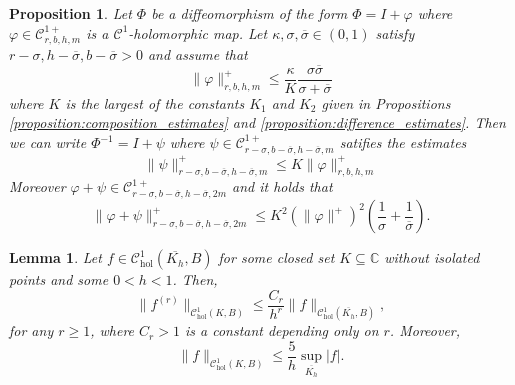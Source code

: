 \documentclass[10pt,a4paper]{amsart}
\newtheorem{proposition}{Proposition}
\newtheorem{lemma}{Lemma}
\newcommand{\C}{\mathbb{C}}
\begin{document}
\begin{proposition}
\label{proposition:inverse_estimates}
 Let $\Phi$ be a diffeomorphism of the form $\Phi=I+\varphi$ where $\varphi\in\mathscr C^{1+}_{r,b,h,m}$ is a $\mathscr C^1$-holomorphic map. Let $\kappa,\sigma,\overline\sigma\in(0,1)$ satisfy $r-\sigma,h-\overline\sigma,b-\overline\sigma>0$ and assume that 
 \begin{equation}
 \label{equation:assumption_inverse}
 \|\varphi\|_{r,b,h,m}^+
 \leq
 \frac{\kappa}
 {K}\frac{\sigma\overline\sigma}{\sigma+\overline\sigma}
 \end{equation}
 where $K$ is the largest of the constants $K_1$ and $K_2$ given in Propositions \ref{proposition:composition_estimates} and \ref{proposition:difference_estimates}. Then we can write $\Phi^{-1} = I+\psi$ where 
 $\psi\in\mathscr C^{1+}_{r-\sigma,b-\overline\sigma,h-\overline\sigma,m}$
 satifies the estimates
 \begin{equation}
 \label{equation:norm_inverse}
 \|\psi\|_{r-\sigma,b-\overline\sigma,h-\overline\sigma,m}^+\leq K\|\varphi\|_{r,b,h,m}^+
 \end{equation}
 Moreover $\varphi+\psi\in\mathscr C^{1+}_{r-\sigma,b-\overline\sigma,h-\overline\sigma,2m}$ and it holds that
 \begin{equation}
 \label{equation:norm_inverse_plus_diffeo}
 \|\varphi+\psi\|_{r-\sigma,b-\overline\sigma,h-\overline\sigma,2m}^+ \leq K^2({\|\varphi\|^+})^2\left(\frac{1}{\sigma}+\frac{1}{\overline\sigma}\right).
 \end{equation}
\end{proposition}

\begin{lemma}
\label{lem:cauchy}
Let $f \in \mathscr C_{\text{hol}}^1(\overline{K_h},B)$ for some closed set $K \subseteq \C$ without isolated points and some $0 < h < 1$. Then,
\[ \|f^{(r)}\|_{\mathscr C^1_{\text{hol}}(K,B)} \leq \frac{C_r}{h^r} \|f\|_{\mathscr C^1_{\text{hol}}(\overline{K_h},B)},\]
for any $r \geq 1$, where $C_r > 1$ is a constant depending only on $r$. Moreover,
\[
\|f\|_{\mathscr C^1_{\text{hol}}(K,B)}\leq \frac{5}{h}\sup_{\overline{K_h}}|f|.
\]
\end{lemma}
\end{document}

